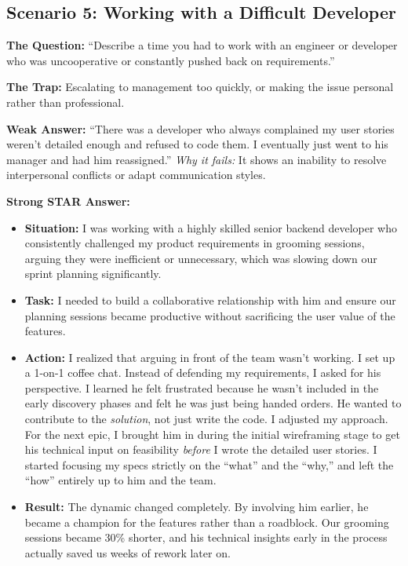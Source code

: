 \subsection{Scenario 5: Working with a Difficult
Developer}\label{scenario-5-working-with-a-difficult-developer}

\textbf{The Question:} ``Describe a time you had to work with an
engineer or developer who was uncooperative or constantly pushed back on
requirements.''

\textbf{The Trap:} Escalating to management too quickly, or making the
issue personal rather than professional.

\textbf{Weak Answer:} ``There was a developer who always complained my
user stories weren't detailed enough and refused to code them. I
eventually just went to his manager and had him reassigned.'' \emph{Why
it fails:} It shows an inability to resolve interpersonal conflicts or
adapt communication styles.

\textbf{Strong STAR Answer:}

\begin{itemize}
\tightlist
\item
  \textbf{Situation:} I was working with a highly skilled senior backend
  developer who consistently challenged my product requirements in
  grooming sessions, arguing they were inefficient or unnecessary, which
  was slowing down our sprint planning significantly.
\item
  \textbf{Task:} I needed to build a collaborative relationship with him
  and ensure our planning sessions became productive without sacrificing
  the user value of the features.
\item
  \textbf{Action:} I realized that arguing in front of the team wasn't
  working. I set up a 1-on-1 coffee chat. Instead of defending my
  requirements, I asked for his perspective. I learned he felt
  frustrated because he wasn't included in the early discovery phases
  and felt he was just being handed orders. He wanted to contribute to
  the \emph{solution}, not just write the code. I adjusted my approach.
  For the next epic, I brought him in during the initial wireframing
  stage to get his technical input on feasibility \emph{before} I wrote
  the detailed user stories. I started focusing my specs strictly on the
  ``what'' and the ``why,'' and left the ``how'' entirely up to him and
  the team.
\item
  \textbf{Result:} The dynamic changed completely. By involving him
  earlier, he became a champion for the features rather than a
  roadblock. Our grooming sessions became 30\% shorter, and his
  technical insights early in the process actually saved us weeks of
  rework later on.
\end{itemize}

